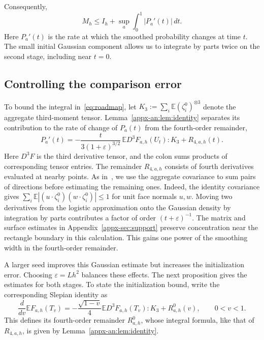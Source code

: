 \documentclass[11pt,letterpaper]{article}
\theoremstyle{remark}
\newcommand{\E}{\mathbb E}
\begin{document}
Consequently,
\begin{equation}
 M_h\le I_h+\sup_a\int_0^1|P_a'(t)|\,dt .
 \label{eq:roadmap}
\end{equation}
Here \(P_a'(t)\) is the rate at which the smoothed probability changes
at time \(t\). The small initial Gaussian component allows us to
integrate by parts twice on the second stage, including near \(t=0\).

\subsection{Controlling the comparison error}
\label{sec:outline-seeded}

To bound the integral in~\eqref{eq:roadmap}, let
\(K_3:=\sum_i\E(\zeta_i^0)^{\otimes3}\) denote the aggregate
third-moment tensor. Lemma~\ref{appx-an:lem:identity} separates its contribution
to the rate of change of \(P_a(t)\) from the fourth-order remainder,
\begin{equation}
 P_a'(t)=
 -\frac{t}{3(1+\varepsilon)^{3/2}}\,
       \E D^3F_{a,h}(U_t):K_3+R_{4,a,h}(t).
 \label{eq:path-summary}
\end{equation}
Here \(D^3F\) is the third derivative tensor, and the colon sums
products of corresponding tensor entries. The remainder \(R_{4,a,h}\) consists of fourth derivatives evaluated
at nearby points. As in~\cite[Lemmas~22--23]{GaoZhang}, we use the aggregate
covariance to sum pairs of directions before estimating the remaining
ones. Indeed, the identity covariance gives
\(\sum_i\E|(u\cdot\zeta_i^0)(w\cdot\zeta_i^0)|\le1\) for unit face
normals \(u,w\). Moving two derivatives from the logistic approximation
onto the Gaussian density by integration by parts contributes a
factor of order \((t+\varepsilon)^{-1}\). The matrix and surface estimates
in Appendix~\ref{appx-sec:support} preserve concentration near the
rectangle boundary in this calculation. This gains one power of the
smoothing width in the fourth-order remainder.

A larger seed improves this Gaussian estimate but increases the
initialization error. Choosing \(\varepsilon=Lh^2\) balances these
effects. The next proposition gives the estimates for both stages.
To state the initialization bound, write the corresponding Slepian
identity as
\[
 \frac{d}{dv}\E F_{a,h}(T_v)
 =-\frac{\sqrt{1-v}}4\E D^3F_{a,h}(T_v):K_3+R^0_{a,h}(v),
 \qquad 0<v<1.
\]
This defines its fourth-order remainder \(R^0_{a,h}\), whose integral
formula, like that of \(R_{4,a,h}\), is given by
Lemma~\ref{appx-an:lem:identity}.
\end{document}
